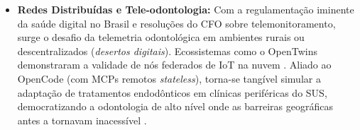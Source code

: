 \begin{itemize}
    \item \textbf{Redes Distribuídas e Tele-odontologia:} Com a regulamentação iminente da saúde digital no Brasil e resoluções do CFO sobre telemonitoramento, surge o desafio da telemetria odontológica em ambientes rurais ou descentralizados (\textit{desertos digitais}). Ecossistemas como o OpenTwins demonstraram a validade de nós federados de IoT na nuvem \cite{infante2025distributed}. Aliado ao OpenCode (com MCPs remotos \textit{stateless}), torna-se tangível simular a adaptação de tratamentos endodônticos \cite{elsaid2025digital} em clínicas periféricas do SUS, democratizando a odontologia de alto nível onde as barreiras geográficas antes a tornavam inacessível \cite{cuadros2023assessing}.
\end{itemize}
